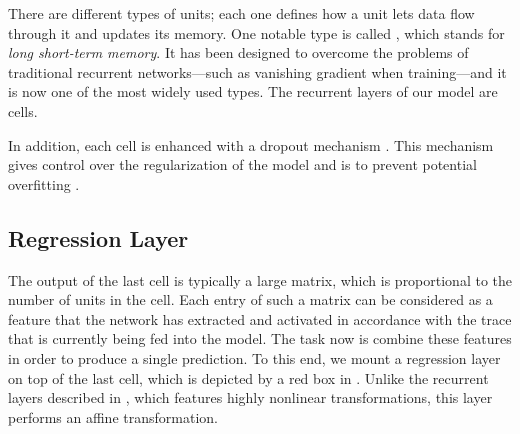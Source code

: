 There are different types of units; each one defines how a unit lets data flow
through it and updates its memory. One notable type is called 
\cite{hochreiter1997}, which stands for \emph{long short-term memory}. It has
been designed to overcome the problems of traditional recurrent networks---such
as vanishing gradient when training---and it is now one of the most widely used
types. The recurrent layers of our model are  cells.

In addition, each cell is enhanced with a dropout mechanism \cite{zaremba2014}.
This mechanism gives control over the regularization of the model and is to
prevent potential overfitting \cite{hastie2009}.

\subsection{Regression Layer}
The output of the last cell is typically a large matrix, which is proportional
to the number of units in the cell. Each entry of such a matrix can be
considered as a feature that the network has extracted and activated in
accordance with the trace that is currently being fed into the model. The task
now is combine these features in order to produce a single prediction. To this
end, we mount a regression layer on top of the last cell, which is depicted by a
red box in . Unlike the recurrent layers described in
, which features highly nonlinear transformations, this layer
performs an affine transformation.

